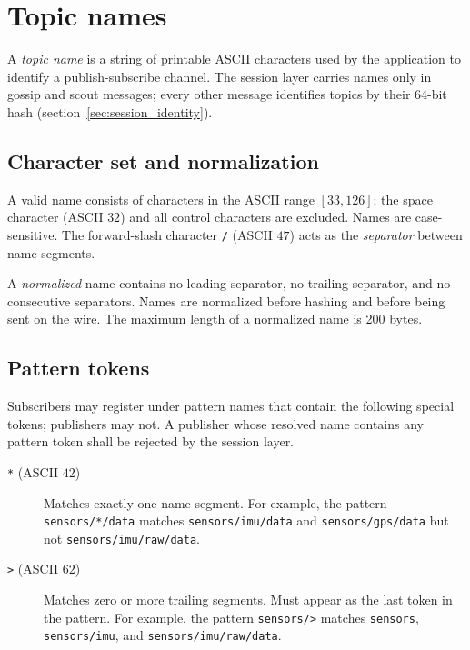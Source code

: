 \section{Topic names}\label{sec:session_names}

A \emph{topic name} is a string of printable ASCII characters used by the application
to identify a publish-subscribe channel.
The session layer carries names only in gossip and scout messages; every other
message identifies topics by their 64-bit hash (section~\ref{sec:session_identity}).

\subsection{Character set and normalization}

A valid name consists of characters in the ASCII range $[33, 126]$; the space
character (ASCII $32$) and all control characters are excluded.
Names are case-sensitive.
The forward-slash character \texttt{/} (ASCII $47$) acts as the \emph{separator}
between name segments.

A \emph{normalized} name contains no leading separator, no trailing separator, and
no consecutive separators. Names are normalized before hashing and before being sent
on the wire. The maximum length of a normalized name is 200 bytes.

\subsection{Pattern tokens}

Subscribers may register under pattern names that contain the following special
tokens; publishers may not. A publisher whose resolved name contains any pattern
token shall be rejected by the session layer.

\begin{description}
    \item[\texttt{*} (ASCII $42$)] Matches exactly one name segment.
    For example, the pattern \texttt{sensors/*/data} matches \texttt{sensors/imu/data}
    and \texttt{sensors/gps/data} but not \texttt{sensors/imu/raw/data}.

    \item[\texttt{>} (ASCII $62$)] Matches zero or more trailing segments.
    Must appear as the last token in the pattern.
    For example, the pattern \texttt{sensors/>} matches \texttt{sensors},
    \texttt{sensors/imu}, and \texttt{sensors/imu/raw/data}.
\end{description}

